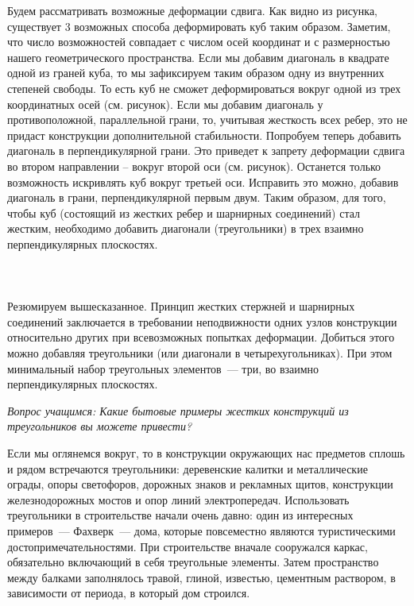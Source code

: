 Будем рассматривать возможные деформации сдвига. Как видно из рисунка, существует 3 возможных способа деформировать куб таким образом. Заметим, что число возможностей совпадает с числом осей координат и с размерностью нашего геометрического пространства. Если мы добавим диагональ в квадрате одной из граней куба, то мы зафиксируем таким образом одну из внутренних степеней свободы. То есть куб не сможет деформироваться вокруг одной из трех координатных осей (см. рисунок). Если мы добавим диагональ у противоположной, параллельной грани, то, учитывая жесткость всех ребер, это не придаст конструкции дополнительной стабильности. Попробуем теперь добавить диагональ в перпендикулярной грани. Это приведет к запрету деформации сдвига во втором направлении – вокруг второй оси (см. рисунок). Останется только возможность искривлять куб вокруг третьей оси. Исправить это можно, добавив диагональ в грани, перпендикулярной первым двум. Таким образом, для того, чтобы куб (состоящий из жестких ребер и шарнирных соединений) стал жестким, необходимо добавить диагонали (треугольники) в трех взаимно перпендикулярных плоскостях.\\\\

\\\\

Резюмируем вышесказанное. Принцип жестких стержней и шарнирных соединений заключается в требовании неподвижности одних узлов конструкции относительно других при всевозможных попытках деформации. Добиться этого можно добавляя треугольники (или диагонали в четырехугольниках). При этом минимальный набор треугольных элементов~--- три, во взаимно перпендикулярных плоскостях.

{\slshape Вопрос учащимся: Какие бытовые примеры жестких конструкций из треугольников вы можете привести?}

Если мы оглянемся вокруг, то в конструкции окружающих нас предметов сплошь и рядом встречаются треугольники: деревенские калитки и металлические ограды, опоры светофоров, дорожных знаков и рекламных щитов, конструкции железнодорожных мостов и опор линий электропередач. Использовать треугольники в строительстве начали очень давно: один из интересных примеров~--- Фахверк~--- дома, которые повсеместно являются туристическими достопримечательностями. При строительстве вначале сооружался каркас, обязательно включающий в себя треугольные элементы. Затем пространство между балками заполнялось травой, глиной, известью, цементным раствором, в зависимости от периода, в который дом строился.\\\\

